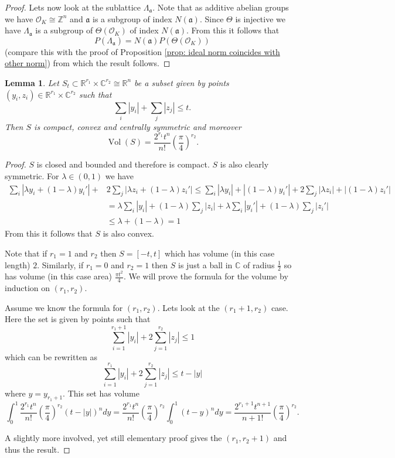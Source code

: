 \documentclass[11pt,a4paper]{report}
\theoremstyle{plain}
\newtheorem{lemma}[subsection]{Lemma}
\theoremstyle{definition}
\theoremstyle{definition}
\newcommand{\ZZ}{\mathbb{Z}}
\newcommand{\RR}{\mathbb{R}}
\def\CC{\mathbb{C}}
\def \lam {\lambda}
\def \OO {\mathcal{O}}
\def\gotha{\mathfrak{a}}
\DeclareMathOperator{\Vol}{Vol}
\begin{document}
\begin{proof}
		Lets now look at the sublattice $\Lambda_\gotha$. Note that as additive abelian groups we have $\OO_K \cong \ZZ^n$ and $\gotha$ is a subgroup of index $N(\gotha)$. Since $\Theta$ is injective we have $\Lambda_\gotha$ is a subgroup of $\Theta(\OO_K)$ of index $N(\gotha)$. From this it follows that \[P(\Lambda_{\gotha})=N(\gotha)P(\Theta(\OO_K))\] (compare this with the proof of Proposition \ref{prop: ideal norm coincides with other norm}) from which the result follows. 
	\end{proof}
	
	\begin{lemma}\label{lem: vol of S}
		Let $S_t \subset \RR^{r_1} \times \CC^{r_2} \cong \RR^n$ be a subset given by points $(y_i,z_i) \in \RR^{r_1} \times \CC^{r_2}$  such that \[\sum_i |y_i|+ \sum_j |z_j| \leq t.\] Then $S$ is compact, convex and centrally symmetric and moreover \[\Vol(S)=\frac{2^{r_1}t^n}{n!}  \left( \frac{\pi}{4}\right)^{r_2}. \]
	\end{lemma}
	
	\begin{proof}
		$S$ is closed and bounded and therefore is compact. $S$ is also clearly symmetric. For $\lam \in (0,1)$ we have \begin{align*}
			\sum_i |\lam y_i+(1-\lam)y_i'|+& 2 \sum_j |\lam z_i+(1-\lam)z_i'|  \leq \sum_i |\lam y_i|+|(1-\lam)y_i'|+2 \sum_j |\lam z_i|+|(1-\lam)z_i'|\\ & = \lam \sum_i | y_i|+(1-\lam)\sum_j |z_i| + \lam \sum_i | y_i'|+(1-\lam)\sum_j |z_i'| \\& \leq  \lam+(1-\lam)=1
		\end{align*}From this it follows that $S$ is also convex.
		
		Note that if $r_1=1$ and $r_2$ then $S=[-t,t]$ which has volume (in this case length) $2$. Similarly, if $r_1=0$ and $r_2=1$ then $S$ is just a ball in $\CC$ of radius $\frac{1}{2}$ so has volume (in this case area) $\frac{\pi t^2}{4}$. We will prove the formula for the volume by induction on $(r_1,r_2)$.
		
		Assume we know the formula for $(r_1,r_2)$. Lets look at the $(r_1+1,r_2)$ case. Here the set is given by points such that \[\sum_{i=1}^{r_1+1}|y_i|+ 2\sum_{j=1}^{r_2} |z_j| \leq 1\] which can be rewritten as \[\sum_{i=1}^{r_1}|y_i|+ 2\sum_{j=1}^{r_2} |z_j| \leq t-|y|\] where $y=y_{r_1+1}$. This set has volume \[\int_{0}^{1} \frac{2^{r_1}t^n}{n!}  \left( \frac{\pi}{4}\right)^{r_2} (t-|y|)^n dy= \frac{2^{r_1}t^n}{n!}  \left( \frac{\pi}{4}\right)^{r_2} \int_{0}^{1}(t-y)^n dy=\frac{2^{r_1+1}t^{n+1}}{n+1!}  \left( \frac{\pi}{4}\right)^{r_2}. \] 
		
		A slightly more involved, yet still elementary proof gives the $(r_1,r_2+1)$ and thus the result.
	\end{proof}
	
\end{document}
